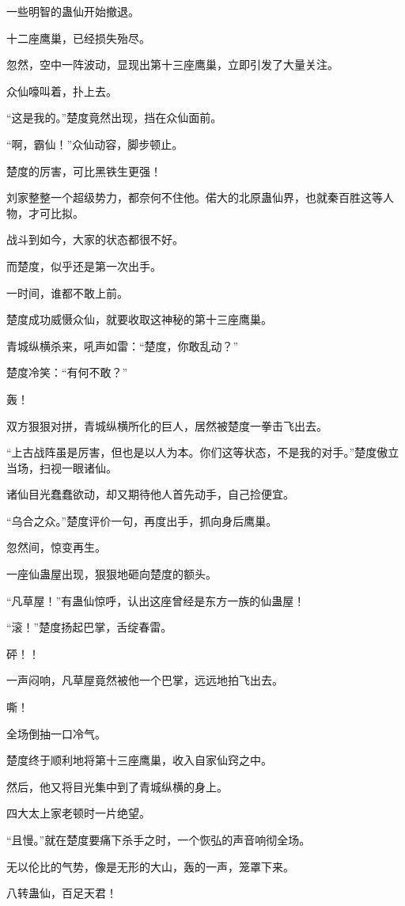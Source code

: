 \begin{this_body}
一些明智的蛊仙开始撤退。

十二座鹰巢，已经损失殆尽。

忽然，空中一阵波动，显现出第十三座鹰巢，立即引发了大量关注。

众仙嚎叫着，扑上去。

“这是我的。”楚度竟然出现，挡在众仙面前。

“啊，霸仙！”众仙动容，脚步顿止。

楚度的厉害，可比黑铁生更强！

刘家整整一个超级势力，都奈何不住他。偌大的北原蛊仙界，也就秦百胜这等人物，才可比拟。

战斗到如今，大家的状态都很不好。

而楚度，似乎还是第一次出手。

一时间，谁都不敢上前。

楚度成功威慑众仙，就要收取这神秘的第十三座鹰巢。

青城纵横杀来，吼声如雷：“楚度，你敢乱动？”

楚度冷笑：“有何不敢？”

轰！

双方狠狠对拼，青城纵横所化的巨人，居然被楚度一拳击飞出去。

“上古战阵虽是厉害，但也是以人为本。你们这等状态，不是我的对手。”楚度傲立当场，扫视一眼诸仙。

诸仙目光蠢蠢欲动，却又期待他人首先动手，自己捡便宜。

“乌合之众。”楚度评价一句，再度出手，抓向身后鹰巢。

忽然间，惊变再生。

一座仙蛊屋出现，狠狠地砸向楚度的额头。

“凡草屋！”有蛊仙惊呼，认出这座曾经是东方一族的仙蛊屋！

“滚！”楚度扬起巴掌，舌绽春雷。

砰！！

一声闷响，凡草屋竟然被他一个巴掌，远远地拍飞出去。

嘶！

全场倒抽一口冷气。

楚度终于顺利地将第十三座鹰巢，收入自家仙窍之中。

然后，他又将目光集中到了青城纵横的身上。

四大太上家老顿时一片绝望。

“且慢。”就在楚度要痛下杀手之时，一个恢弘的声音响彻全场。

无以伦比的气势，像是无形的大山，轰的一声，笼罩下来。

八转蛊仙，百足天君！


\end{this_body}
